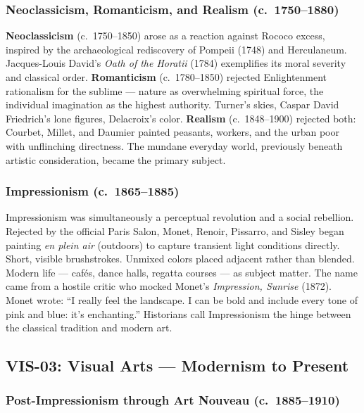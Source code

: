 \documentclass[11pt,letterpaper]{article}
\begin{document}
\subsubsection{Neoclassicism, Romanticism, and Realism (c.~1750--1880)}

\textbf{Neoclassicism} (c.~1750--1850) arose as a reaction against Rococo excess, inspired by the archaeological rediscovery of Pompeii (1748) and Herculaneum. Jacques-Louis David's \emph{Oath of the Horatii} (1784) exemplifies its moral severity and classical order. \textbf{Romanticism} (c.~1780--1850) rejected Enlightenment rationalism for the sublime --- nature as overwhelming spiritual force, the individual imagination as the highest authority. Turner's skies, Caspar David Friedrich's lone figures, Delacroix's color. \textbf{Realism} (c.~1848--1900) rejected both: Courbet, Millet, and Daumier painted peasants, workers, and the urban poor with unflinching directness. The mundane everyday world, previously beneath artistic consideration, became the primary subject.

\subsubsection{Impressionism (c.~1865--1885)}

Impressionism was simultaneously a perceptual revolution and a social rebellion. Rejected by the official Paris Salon, Monet, Renoir, Pissarro, and Sisley began painting \emph{en plein air} (outdoors) to capture transient light conditions directly. Short, visible brushstrokes. Unmixed colors placed adjacent rather than blended. Modern life --- cafés, dance halls, regatta courses --- as subject matter. The name came from a hostile critic who mocked Monet's \emph{Impression, Sunrise} (1872). Monet wrote: ``I really feel the landscape. I can be bold and include every tone of pink and blue: it's enchanting.'' Historians call Impressionism the hinge between the classical tradition and modern art.

\subsection{VIS-03: Visual Arts --- Modernism to Present}

\subsubsection{Post-Impressionism through Art Nouveau (c.~1885--1910)}
\end{document}
